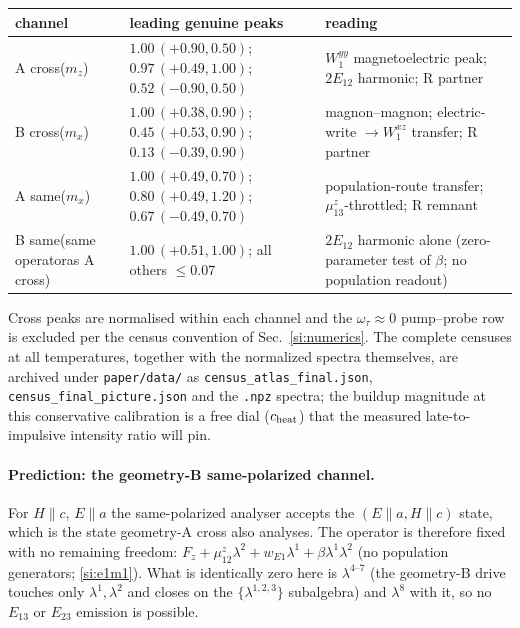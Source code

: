 \documentclass[11pt]{article}
\begin{document}
\begin{center}\footnotesize
\renewcommand{\arraystretch}{1.2}
\begin{tabular}{p{1.5cm}p{4.4cm}p{5.6cm}}
\toprule
channel & leading genuine peaks & reading\\
\midrule
A cross\newline ($m_z$) & $1.00\,(+0.90,0.50)$;
  $0.97\,(+0.49,1.00)$; $0.52\,(-0.90,0.50)$ &
  $W^{yy}_1$ magnetoelectric peak; $2E_{12}$ harmonic; R partner\\
B cross\newline ($m_x$) & $1.00\,(+0.38,0.90)$;
  $0.45\,(+0.53,0.90)$; $0.13\,(-0.39,0.90)$ &
  magnon--magnon; electric-write $\to W^{xz}_1$ transfer; R partner\\
A same\newline ($m_x$) & $1.00\,(+0.49,0.70)$;
  $0.80\,(+0.49,1.20)$; $0.67\,(-0.49,0.70)$ &
  population-route transfer; $\mu^z_{13}$-throttled; R remnant\\
B same\newline (same operator\newline as A cross) &
  $1.00\,(+0.51,1.00)$; all others $\leq0.07$ &
  $2E_{12}$ harmonic alone (zero-parameter test of $\beta$; no
  population readout)\\
\bottomrule
\end{tabular}
\end{center}
Cross peaks are normalised within each channel and the
$\omega_\tau\!\approx\!0$ pump--probe row is excluded per the census
convention of Sec.~\ref{si:numerics}.
The complete censuses at all temperatures, together with the normalized
spectra themselves, are archived under
\texttt{paper/data/} as \texttt{census\_atlas\_final.json},
\texttt{census\_final\_picture.json} and the \texttt{.npz} spectra; the buildup magnitude at this conservative
calibration is a free dial ($c_{\rm heat}$) that the measured
late-to-impulsive intensity ratio will pin.

\paragraph{Prediction: the geometry-B same-polarized channel.}
\label{si:Bsamepred}
For $H\parallel c$, $E\parallel a$ the same-polarized analyser accepts
the $(E\!\parallel\!a,H\!\parallel\!c)$ state, which is the state
geometry-A cross also analyses.  The operator is therefore fixed with no
remaining freedom:
$F_z+\mu^z_{12}\lambda^2+w_{E1}\lambda^1+\beta\lambda^1\lambda^2$
(no population generators; \cref{si:e1m1}).  What is identically zero
here is $\lambda^{4\text{--}7}$ (the geometry-B drive touches only
$\lambda^1,\lambda^2$ and closes on the $\{\lambda^{1,2,3}\}$
subalgebra) and $\lambda^8$ with it, so no $E_{13}$ or $E_{23}$
emission is possible.
\end{document}
